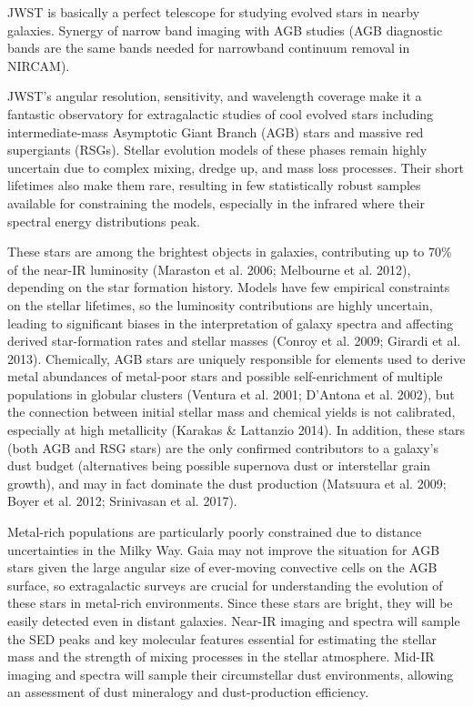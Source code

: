 \documentclass[12pt]{article}
\begin{document}
JWST is basically a perfect telescope for studying evolved stars in nearby galaxies.  Synergy of narrow band imaging with AGB studies (AGB diagnostic bands are the same bands needed for narrowband continuum removal in NIRCAM).

JWST's angular resolution, sensitivity, and wavelength coverage make it a fantastic observatory for extragalactic studies of cool evolved stars including intermediate-mass Asymptotic Giant Branch (AGB) stars and massive red supergiants (RSGs). Stellar evolution models of these phases remain highly uncertain due to complex mixing, dredge up, and mass loss processes. Their short lifetimes also make them rare, resulting in few statistically robust samples available for constraining the models, especially in the infrared where their spectral energy distributions peak.

These stars are among the brightest objects in galaxies, contributing up to 70\% of the near-IR luminosity (Maraston et al. 2006; Melbourne et al. 2012), depending on the star formation history. Models have few empirical constraints on the stellar lifetimes, so the luminosity contributions are highly uncertain, leading to significant biases in the interpretation of galaxy spectra and affecting derived star-formation rates and stellar masses (Conroy et al. 2009; Girardi et al. 2013). Chemically, AGB stars are uniquely responsible for elements used to derive metal abundances of metal-poor stars and possible self-enrichment of multiple populations in globular clusters (Ventura et al. 2001; D'Antona et al. 2002), but the connection between initial stellar mass and chemical yields is not calibrated, especially at high metallicity (Karakas \& Lattanzio 2014). In addition, these stars (both AGB and RSG stars) are the only confirmed contributors to a galaxy's dust budget (alternatives being possible supernova dust or interstellar grain growth), and may in fact dominate the dust production (Matsuura et al. 2009; Boyer et al. 2012; Srinivasan et al. 2017).

Metal-rich populations are particularly poorly constrained due to distance uncertainties in the Milky Way. Gaia may not improve the situation for AGB stars given the large angular size of ever-moving convective cells on the AGB surface, so extragalactic surveys are crucial for understanding the evolution of these stars in metal-rich environments. Since these stars are bright, they will be easily detected even in distant galaxies. Near-IR imaging and spectra will
sample the SED peaks and key molecular features essential for estimating the stellar mass and the strength of mixing processes in the stellar atmosphere. Mid-IR imaging and spectra will sample their circumstellar dust environments, allowing an assessment of dust mineralogy
and dust-production efficiency.
\end{document}
